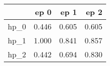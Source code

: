 \begin{tabular}{lrrr}
\toprule
{} &   ep 0 &   ep 1 &   ep 2 \\
\midrule
hp\_0 &  0.446 &  0.605 &  0.605 \\
hp\_1 &  1.000 &  0.841 &  0.857 \\
hp\_2 &  0.442 &  0.694 &  0.830 \\
\bottomrule
\end{tabular}
